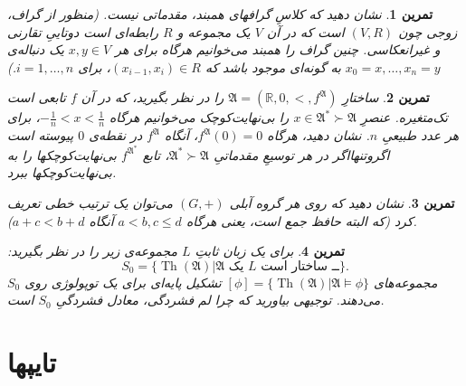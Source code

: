 \documentclass[12pt,a4paper]{report}
\theoremstyle{colorhead}
\newtheorem{tam}{تمرین}
\DeclareMathOperator{\Th}{Th}
\begin{document}
\begin{tam}
نشان دهید که کلاسِ گرافهای همبند، مقدماتی نیست. (منظور از گراف، زوجی چون
$(V,R)$
است که در آن
$V$
یک مجموعه و 
$R$
رابطه‌ای است
دوتاییِ تقارنی و غیرانعکاسی. چنین گراف را همبند می‌خوانیم هرگاه
برای هر
$x,y\in V$
یک دنباله‌ی
$x_0=x,\ldots,x_n=y$
به گونه‌ای موجود باشد که
$(x_{i-1},x_i)\in R$،
برای 
$i=1,\ldots,n$.)
\end{tam}
\begin{tam}
ساختارِ
$\mathfrak{A}=(\mathbb{R},0,<,f^\mathfrak{A})$
را در نظر بگیرید، که در آن
$f$
تابعی است تک‌متغیره. عنصرِ
$x\in \mathfrak{A}^*\succ \mathfrak{A}$
را بی‌نهایت‌کوچک می‌خوانیم هرگاه
$-\frac{1}{n}<x<\frac{1}{n}$،
برای هر عدد طبیعیِ
$n$.
نشان دهید، هرگاه
$f^\mathfrak{A}(0)=0$،
آنگاه 
$f^\mathfrak{A}$
در نقطه‌ی
$0$
پیوسته است اگروتنهااگر در هر توسیعِ مقدماتیِ
$\mathfrak{A}^*\succ \mathfrak{A}$،
تابع
$f^{\mathfrak{A}^*}$
بی‌نهایت‌کوچکها را به بی‌نهایت‌کوچکها ببرد.
\end{tam}
\begin{tam}
نشان دهید که روی هر گروه آبلی
$(G,+)$
می‌توان یک ترتیب خطی تعریف کرد (که البته حافظ جمع است، یعنی هرگاه
$a<b,c\leq d$
آنگاه
$a+c< b+d$).
\end{tam}
\begin{tam}
برای یک زبان ثابتِ
$L$
مجموعه‌ی زیر را در نظر بگیرید:
\[
S_0=\{\Th(\mathfrak{A})|\text{$\mathfrak{A}$ یک $L$ ــ‌ ساختار است}\}.
\]
مجموعه‌های
$[\phi]=\{\Th(\mathfrak{A})|\mathfrak{A}\models \phi\}$
تشکیل
پایه‌ای برای یک توپولوژی روی
$S_0$
می‌دهند. توجیهی بیاورید که چرا لم فشردگی، معادل فشردگیِ
$S_0$
است.
\end{tam}
\section{تایپها}
\end{document}

